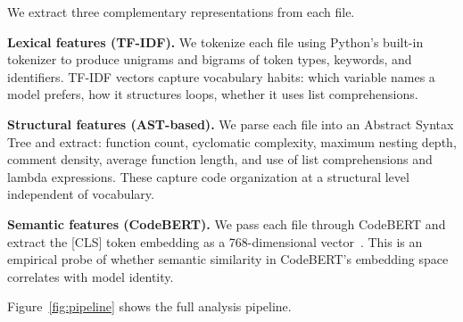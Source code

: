 \documentclass[sigconf]{acmart}
\begin{document}
We extract three complementary representations from each file.

\textbf{Lexical features (TF-IDF).} We tokenize each file using Python's built-in tokenizer to produce unigrams and bigrams of token types, keywords, and identifiers. TF-IDF vectors capture vocabulary habits: which variable names a model prefers, how it structures loops, whether it uses list comprehensions.

\textbf{Structural features (AST-based).} We parse each file into an Abstract Syntax Tree and extract: function count, cyclomatic complexity, maximum nesting depth, comment density, average function length, and use of list comprehensions and lambda expressions. These capture code organization at a structural level independent of vocabulary.

\textbf{Semantic features (CodeBERT).} We pass each file through CodeBERT and extract the [CLS] token embedding as a 768-dimensional vector~\cite{feng2020codebert}. This is an empirical probe of whether semantic similarity in CodeBERT's embedding space correlates with model identity.

Figure~\ref{fig:pipeline} shows the full analysis pipeline.
\end{document}
